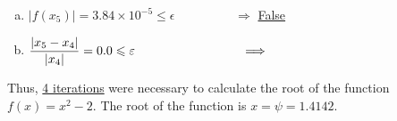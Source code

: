 \begin{list}{\bf Example :~}{}
\begin{description}
\begin{list}{{\bf Iteration } (k=):~}{}
\begin{enumerate}[(a)]
                         \item $\left|f\left(x_{5}\right)\right| = 3.84\times 10^{-5} \leq \epsilon \hspace{2cm} \Longrightarrow$ \underline{False}
                         \item $\frc{\left|x_{5}-x_{4}\right|}{\left|x_{4}\right|} = 0.0 \leq \epsilon \hspace{3cm} \Longrightarrow$ 
                    \end{enumerate}
         \end{list}
         Thus, \underline{4 iterations} were necessary to calculate the root of the function $f(x)=x^{2}-2$. The root of the function is \underline{$x=\psi=1.4142$}.
       \end{description}
         

\end{list}
